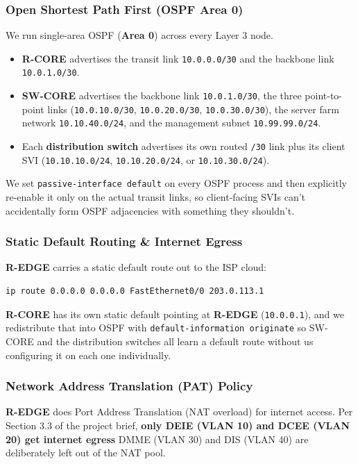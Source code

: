 \documentclass[11pt,a4paper]{article}
\begin{document}
\subsubsection{Open Shortest Path First (OSPF Area 0)}
We run single-area OSPF (\textbf{Area 0}) across every Layer 3 node.
\begin{itemize}
    \item \textbf{R-CORE} advertises the transit link \texttt{10.0.0.0/30} and the backbone link \texttt{10.0.1.0/30}.
    \item \textbf{SW-CORE} advertises the backbone link \texttt{10.0.1.0/30}, the three point-to-point links (\texttt{10.0.10.0/30}, \texttt{10.0.20.0/30}, \texttt{10.0.30.0/30}), the server farm network \texttt{10.10.40.0/24}, and the management subnet \texttt{10.99.99.0/24}.
    \item Each \textbf{distribution switch} advertises its own routed \texttt{/30} link plus its client SVI (\texttt{10.10.10.0/24}, \texttt{10.10.20.0/24}, or \texttt{10.10.30.0/24}).
\end{itemize}
We set \texttt{passive-interface default} on every OSPF process and then explicitly re-enable it only on the actual transit links, so client-facing SVIs can't accidentally form OSPF adjacencies with something they shouldn't.

\subsubsection{Static Default Routing \& Internet Egress}
\textbf{R-EDGE} carries a static default route out to the ISP cloud:
\begin{lstlisting}[style=ciscostyle]
ip route 0.0.0.0 0.0.0.0 FastEthernet0/0 203.0.113.1
\end{lstlisting}
\textbf{R-CORE} has its own static default pointing at \textbf{R-EDGE} (\texttt{10.0.0.1}), and we redistribute that into OSPF with \texttt{default-information originate} so SW-CORE and the distribution switches all learn a default route without us configuring it on each one individually.

\subsubsection{Network Address Translation (PAT) Policy}
\textbf{R-EDGE} does Port Address Translation (NAT overload) for internet access. Per Section 3.3 of the project brief, \textbf{only DEIE (VLAN 10) and DCEE (VLAN 20) get internet egress} DMME (VLAN 30) and DIS (VLAN 40) are deliberately left out of the NAT pool.
\end{document}
